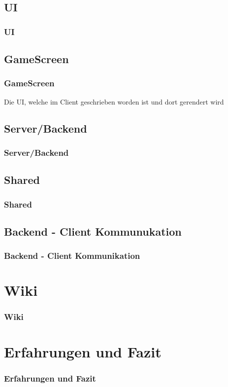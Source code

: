 \documentclass{beamer}
\begin{document}
\subsection{UI}
\begin{frame}
  \frametitle{UI}
\end{frame}

\subsection{GameScreen}
\begin{frame}
\frametitle{GameScreen}
  Die UI, welche im Client geschrieben worden ist und dort gerendert wird
\end{frame}


\subsection{Server/Backend}
\begin{frame}
\frametitle{Server/Backend}
\end{frame}

\subsection{Shared}
\begin{frame}
\frametitle{Shared}
\end{frame}

\subsection{Backend - Client Kommunukation}
\begin{frame}
\frametitle{Backend - Client Kommunikation}
\end{frame}

\section{Wiki}
\begin{frame}
\frametitle{Wiki}

\end{frame}

\section{Erfahrungen und Fazit}
\begin{frame}
\frametitle{Erfahrungen und Fazit}

\end{frame}
\end{document}
